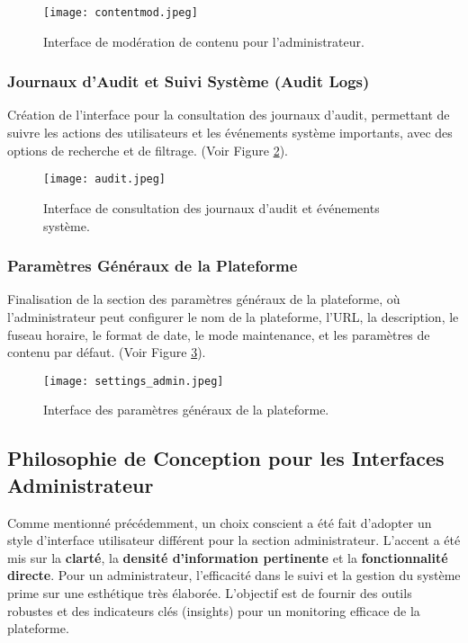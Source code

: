 \documentclass[12pt, a4paper]{article}
\begin{document}
\begin{figure}[htbp]
  \centering
  \texttt{[image: contentmod.jpeg]} 
  \caption{Interface de modération de contenu pour l'administrateur.}
  \label{fig:admin_content_moderation}
\end{figure}

\subsubsection{Journaux d'Audit et Suivi Système (Audit Logs)}
Création de l'interface pour la consultation des journaux d'audit, permettant de suivre les actions des utilisateurs et les événements système importants, avec des options de recherche et de filtrage. (Voir Figure \ref{fig:admin_audit_logs}).

\begin{figure}[htbp]
  \centering
  \texttt{[image: audit.jpeg]} 
  \caption{Interface de consultation des journaux d'audit et événements système.}
  \label{fig:admin_audit_logs}
\end{figure}

\subsubsection{Paramètres Généraux de la Plateforme}
Finalisation de la section des paramètres généraux de la plateforme, où l'administrateur peut configurer le nom de la plateforme, l'URL, la description, le fuseau horaire, le format de date, le mode maintenance, et les paramètres de contenu par défaut. (Voir Figure \ref{fig:admin_platform_settings}).

\begin{figure}[htbp]
  \centering
  \texttt{[image: settings\_admin.jpeg]} 
  \caption{Interface des paramètres généraux de la plateforme.}
  \label{fig:admin_platform_settings}
\end{figure}

\subsection{Philosophie de Conception pour les Interfaces Administrateur}
Comme mentionné précédemment, un choix conscient a été fait d'adopter un style d'interface utilisateur différent pour la section administrateur. L'accent a été mis sur la \textbf{clarté}, la \textbf{densité d'information pertinente} et la \textbf{fonctionnalité directe}. Pour un administrateur, l'efficacité dans le suivi et la gestion du système prime sur une esthétique très élaborée. L'objectif est de fournir des outils robustes et des indicateurs clés (insights) pour un monitoring efficace de la plateforme.
\end{document}
